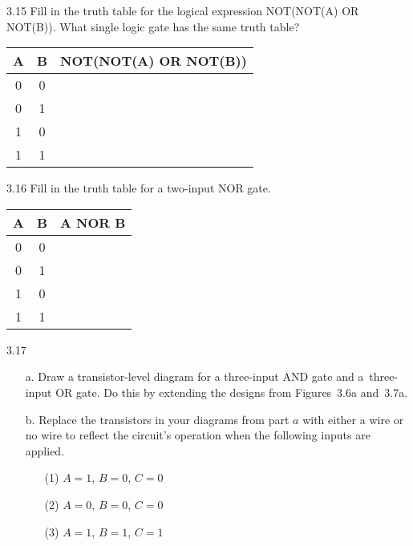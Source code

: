 \documentclass{patt}
\begin{document}
\begin{exercises}
\item[3.15] Fill in the truth table for the logical expression
  NOT(NOT(A) OR NOT(B)). What single logic gate has the same truth
  table?

\begin{inlinetable}
\tabcolsep=12pt
\begin{tabular}{@{}cc|c} \hline
{ A}\rule{0pt}{10.1pt} & { B}
& { NOT(NOT(A) OR NOT(B))}\\ \hline
\rule{0pt}{10.1pt}0\rule{0pt}{10.1pt} & 0 & \\[2.6pt]
0 & 1 & \\[2.6pt]
1 & 0 & \\[2.6pt]
1 & 1 & \\\hline
\end{tabular}
\end{inlinetable}

\item[3.16] Fill in the truth table for a two-input NOR gate.

\begin{inlinetable}
\tabcolsep=12pt
\begin{tabular}{@{}cc|c} \hline
A & B & \rule{0pt}{10pt}A NOR B\rule{0pt}{10.1pt}\\ \hline
\rule{0pt}{10.1pt}0 & 0 & \\[2.6pt]
0 & 1 & \\[2.6pt]
1 & 0 & \\[2.6pt]
1 & 1 & \\\hline
\end{tabular}
\end{inlinetable}

\item[3.17]
\begin{enumerate}
\item[a.]  Draw a transistor-level diagram for a three-input AND gate
  and a~three-input OR gate. Do this by extending the designs from
  Figures~3.6a and~3.7a.


\item[b.]  Replace the transistors in your diagrams from part $a$ with
  either a wire or no wire to reflect the circuit's operation when the
  following inputs are applied.
\begin{enumerate}[\rm(3)]
\item[\rm(1)] $A = 1$, $B = 0$, $C = 0$
\item[\rm(2)] $A = 0$, $B = 0$, $C = 0$
\item[\rm(3)] $A = 1$, $B = 1$, $C = 1$
\end{enumerate}
\end{enumerate}


\end{exercises}
\end{document}
